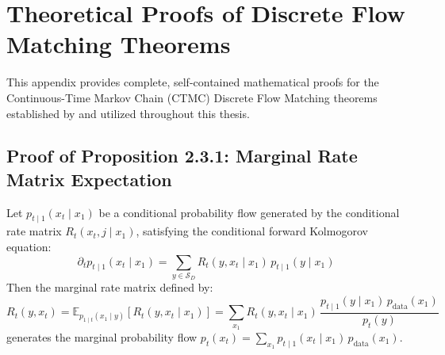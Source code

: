 \chapter{Theoretical Proofs of Discrete Flow Matching Theorems}

This appendix provides complete, self-contained mathematical proofs for the Continuous-Time Markov Chain (CTMC) Discrete Flow Matching theorems established by \citet{Campbell2024} and utilized throughout this thesis.

\section{Proof of Proposition 2.3.1: Marginal Rate Matrix Expectation}

\begin{pro}
Let $p_{t \mid 1}(x_t \mid x_1)$ be a conditional probability flow generated by the conditional rate matrix $R_t(x_t, j \mid x_1)$, satisfying the conditional forward Kolmogorov equation:
\begin{equation}
\partial_t p_{t \mid 1}(x_t \mid x_1) = \sum_{y \in \mathcal{S}_D} R_t(y, x_t \mid x_1) \, p_{t \mid 1}(y \mid x_1)
\label{eq:app_cond_kolm}
\end{equation}
Then the marginal rate matrix defined by:
\begin{equation}
R_t(y, x_t) = \mathbb{E}_{p_{1 \mid t}(x_1 \mid y)} \left[ R_t(y, x_t \mid x_1) \right] = \sum_{x_1} R_t(y, x_t \mid x_1) \, \frac{p_{t \mid 1}(y \mid x_1) \, p_{\text{data}}(x_1)}{p_t(y)}
\label{eq:app_marginal_rate_def}
\end{equation}
generates the marginal probability flow $p_t(x_t) = \sum_{x_1} p_{t \mid 1}(x_t \mid x_1) \, p_{\text{data}}(x_1)$.
\end{pro}

